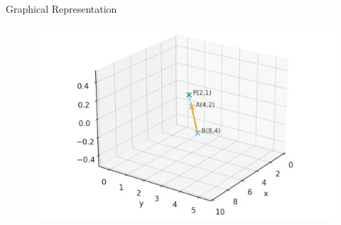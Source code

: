 \documentclass{beamer}
\theoremstyle{remark}
\begin{document}
    \begin{frame}{Graphical Representation}
   \begin{figure}[h!]
\centering
\includegraphics[width=0.7\linewidth]{fig.1.4.6}

\end{figure}
\end{frame}
\end{document}
